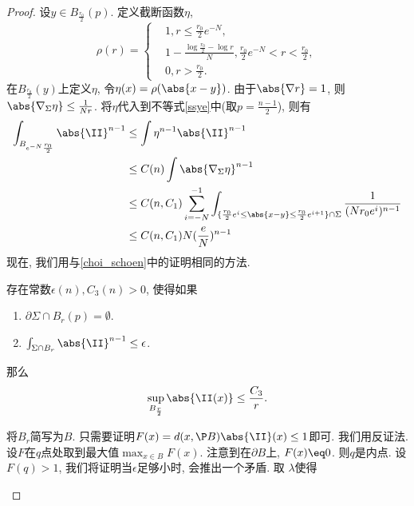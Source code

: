 \begin{proof}
    设$y \in B_{\frac{r_0}{2}}(p)$. 定义截断函数$\eta$,
    \begin{equation}
       \rho(r)=\left\{
           \begin{aligned}
               & 1, r\le \frac{r_0}{2}e^{-N}, \\
               & 1-\frac{\log \frac{r_0}{2}-\log r}{N}, \frac{r_0}{2}e^{-N} < r < \frac{r_0}{2}, \\
               & 0, r>\frac{r_0}{2}.
           \end{aligned}
       \right.
   \end{equation}
   在$B_{\frac{r_0}{2}}(y)$上定义$\eta$, 令$\eta(x)=\rho(\abs{x-y})$. 由于$\abs{\nabla r}=1$, 则$\abs{\nabla_\Sigma \eta} \le \frac{1}{Nr}$. 将$\eta$代入到不等式\eqref{ssye}中(取$p=\frac{n-1}{2}$), 则有
   \begin{equation} \label{tmpaa}
        \begin{split}
            \int_{B_{e^{-N}\frac{r_0}{2}}} \abs{\II}^{n-1} & \le \int \eta^{n-1} \abs{\II}^{n-1} \\
            &\le C(n)\int \abs{\nabla_\Sigma \eta}^{n-1}\\
            &\le C(n,C_1) \sum_{i=-N}^{-1} \int_{\{\frac{r_0}{2}e^{i}\le \abs{x-y} \le \frac{r_0}{2}e^{i+1}\} \cap \Sigma} \frac{1}{(Nr_0 e^{i})^{n-1}} \\
            &\le C(n,C_1)N(\frac{e}{N})^{n-1}
        \end{split}
   \end{equation}
   现在, 我们用与\eqref{choi_schoen}中的证明相同的方法.
   \begin{claim}
       存在常数$\epsilon(n), C_3(n)>0$, 使得如果
        \begin{enumerate}
           \item $\partial \Sigma \cap B_{r}(p)=\emptyset$.
           \item $\int_{\Sigma \cap B_{r}} \abs{\II}^{n-1}\le \epsilon$.
       \end{enumerate}
       那么
       \begin{equation}
           \mathop{\sup}_{B_{\frac{r}{2}}}\abs{\II(x)} \le \frac{C_3}{r}.
       \end{equation}
       \begin{subproof}
            将$B_{r}$简写为$B$. 只需要证明$F(x)=d(x,\P B)\abs{\II}(x) \le 1$即可. 我们用反证法. 设$F$在$q$点处取到最大值$\max_{x \in B}F(x)$. 注意到在$\partial B$上, $F(x) \eq 0$. 则$q$是内点.  设$F(q) > 1$, 我们将证明当$\epsilon$足够小时, 会推出一个矛盾. 取 $\lambda$使得

\end{subproof}
\end{claim}
\end{proof}
